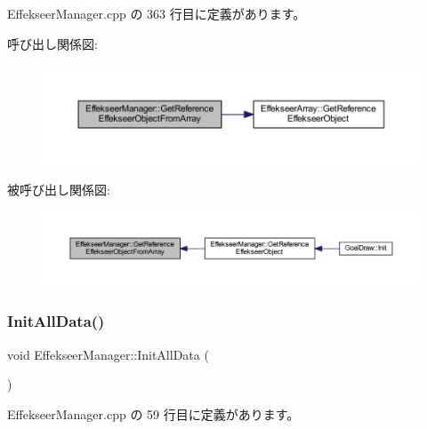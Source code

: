  Effekseer\+Manager.\+cpp の 363 行目に定義があります。

呼び出し関係図\+:\nopagebreak
\begin{figure}[H]
\begin{center}
\leavevmode
\includegraphics[width=350pt]{class_effekseer_manager_a1469d014a3d10dd38dc7d03db7f2ebfe_cgraph}
\end{center}
\end{figure}
被呼び出し関係図\+:\nopagebreak
\begin{figure}[H]
\begin{center}
\leavevmode
\includegraphics[width=350pt]{class_effekseer_manager_a1469d014a3d10dd38dc7d03db7f2ebfe_icgraph}
\end{center}
\end{figure}
\mbox{\label{class_effekseer_manager_ac5744fba29048e417bf46a8fbf5a8e76}} 
\subsubsection{\texorpdfstring{Init\+All\+Data()}{InitAllData()}}
{\footnotesize\ttfamily void Effekseer\+Manager\+::\+Init\+All\+Data (\begin{DoxyParamCaption}{ }\end{DoxyParamCaption})\hspace{0.3cm}{\ttfamily [static]}}



 Effekseer\+Manager.\+cpp の 59 行目に定義があります。

